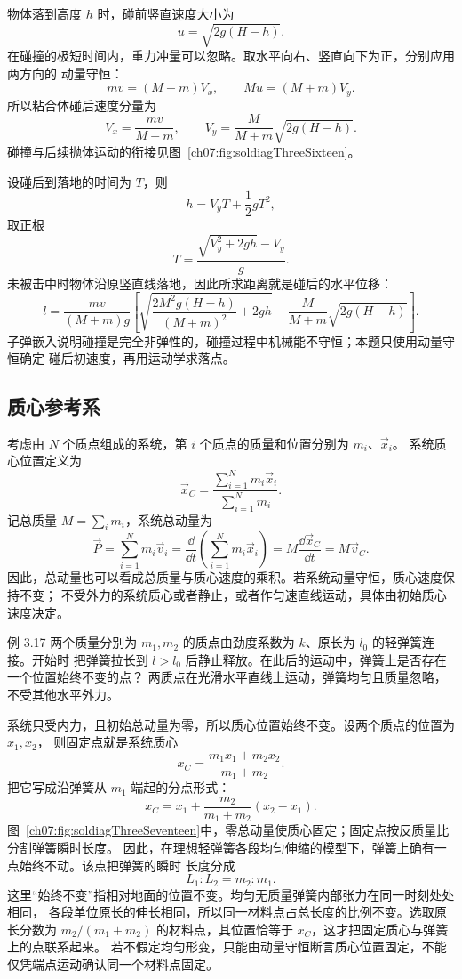 \begin{xesolution}
物体落到高度 $h$ 时，碰前竖直速度大小为
\[
 u=\sqrt{2g(H-h)}.
\]
在碰撞的极短时间内，重力冲量可以忽略。取水平向右、竖直向下为正，分别应用两方向的
动量守恒：
\[
 mv=(M+m)V_x,
 \qquad
 Mu=(M+m)V_y.
\]
所以粘合体碰后速度分量为
\[
 V_x=\frac{mv}{M+m},
 \qquad
 V_y=\frac{M}{M+m}\sqrt{2g(H-h)}.
\]
碰撞与后续抛体运动的衔接见图~\ref{ch07:fig:soldiagThreeSixteen}。

\soldiagThreeSixteen
设碰后到落地的时间为 $T$，则
\[
 h=V_yT+\frac12gT^2,
\]
取正根
\[
 T=\frac{\sqrt{V_y^2+2gh}-V_y}{g}.
\]
未被击中时物体沿原竖直线落地，因此所求距离就是碰后的水平位移：
\[
 \boxed{
 l=\frac{mv}{(M+m)g}
 \left[
 \sqrt{\frac{2M^2g(H-h)}{(M+m)^2}+2gh}
 -\frac{M}{M+m}\sqrt{2g(H-h)}
 \right]}.
\]
子弹嵌入说明碰撞是完全非弹性的，碰撞过程中机械能不守恒；本题只使用动量守恒确定
碰后初速度，再用运动学求落点。
\end{xesolution}

\subsection{质心参考系}

考虑由 $N$ 个质点组成的系统，第 $i$ 个质点的质量和位置分别为 $m_i$、$\vec x_i$。
系统质心位置定义为
\begin{equation}
 \vec x_C=\frac{\sum_{i=1}^{N}m_i\vec x_i}{\sum_{i=1}^{N}m_i}.
\end{equation}
记总质量 $M=\sum_i m_i$，系统总动量为
\begin{equation}
 \vec P=\sum_{i=1}^{N}m_i\vec v_i
 =\frac{\dd}{\dd t}\left(\sum_{i=1}^{N}m_i\vec x_i\right)
 =M\frac{\dd\vec x_C}{\dd t}=M\vec v_C.
\end{equation}
因此，总动量也可以看成总质量与质心速度的乘积。若系统动量守恒，质心速度保持不变；
不受外力的系统质心或者静止，或者作匀速直线运动，具体由初始质心速度决定。

\begin{origexamplebox}{例 3.17}
两个质量分别为 $m_1,m_2$ 的质点由劲度系数为 $k$、原长为 $l_0$ 的轻弹簧连接。开始时
把弹簧拉长到 $l>l_0$ 后静止释放。在此后的运动中，弹簧上是否存在一个位置始终不变的点？
两质点在光滑水平直线上运动，弹簧均匀且质量忽略，不受其他水平外力。
\end{origexamplebox}

\begin{xesolution}
系统只受内力，且初始总动量为零，所以质心位置始终不变。设两个质点的位置为 $x_1,x_2$，
则固定点就是系统质心
\[
 x_C=\frac{m_1x_1+m_2x_2}{m_1+m_2}.
\]
把它写成沿弹簧从 $m_1$ 端起的分点形式：
\[
 x_C=x_1+\frac{m_2}{m_1+m_2}(x_2-x_1).
\]
图~\ref{ch07:fig:soldiagThreeSeventeen}中，零总动量使质心固定；固定点按反质量比分割弹簧瞬时长度。
\soldiagThreeSeventeen
因此，在理想轻弹簧各段均匀伸缩的模型下，弹簧上确有一点始终不动。该点把弹簧的瞬时
长度分成
\[
 \boxed{L_1:L_2=m_2:m_1}.
\]
这里“始终不变”指相对地面的位置不变。均匀无质量弹簧内部张力在同一时刻处处相同，
各段单位原长的伸长相同，所以同一材料点占总长度的比例不变。选取原长分数为
$m_2/(m_1+m_2)$ 的材料点，其位置恰等于 $x_C$，这才把固定质心与弹簧上的点联系起来。
若不假定均匀形变，只能由动量守恒断言质心位置固定，不能仅凭端点运动确认同一个材料点固定。
\end{xesolution}

